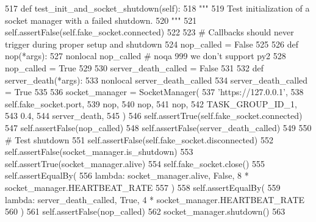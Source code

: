 \begin{DoxyCode}
517     \textcolor{keyword}{def }test\_init\_and\_socket\_shutdown(self):
518         \textcolor{stringliteral}{"""}
519 \textcolor{stringliteral}{        Test initialization of a socket manager with a failed shutdown.}
520 \textcolor{stringliteral}{        """}
521         self.assertFalse(self.fake\_socket.connected)
522 
523         \textcolor{comment}{# Callbacks should never trigger during proper setup and shutdown}
524         nop\_called = \textcolor{keyword}{False}
525 
526         \textcolor{keyword}{def }nop(*args):
527             nonlocal nop\_called  \textcolor{comment}{# noqa 999 we don't support py2}
528             nop\_called = \textcolor{keyword}{True}
529 
530         server\_death\_called = \textcolor{keyword}{False}
531 
532         \textcolor{keyword}{def }server\_death(*args):
533             nonlocal server\_death\_called
534             server\_death\_called = \textcolor{keyword}{True}
535 
536         socket\_manager = SocketManager(
537             \textcolor{stringliteral}{'https://127.0.0.1'},
538             self.fake\_socket.port,
539             nop,
540             nop,
541             nop,
542             TASK\_GROUP\_ID\_1,
543             0.4,
544             server\_death,
545         )
546         self.assertTrue(self.fake\_socket.connected)
547         self.assertFalse(nop\_called)
548         self.assertFalse(server\_death\_called)
549 
550         \textcolor{comment}{# Test shutdown}
551         self.assertFalse(self.fake\_socket.disconnected)
552         self.assertFalse(socket\_manager.is\_shutdown)
553         self.assertTrue(socket\_manager.alive)
554         self.fake\_socket.close()
555         self.assertEqualBy(
556             \textcolor{keyword}{lambda}: socket\_manager.alive, \textcolor{keyword}{False}, 8 * socket\_manager.HEARTBEAT\_RATE
557         )
558         self.assertEqualBy(
559             \textcolor{keyword}{lambda}: server\_death\_called, \textcolor{keyword}{True}, 4 * socket\_manager.HEARTBEAT\_RATE
560         )
561         self.assertFalse(nop\_called)
562         socket\_manager.shutdown()
563 
\end{DoxyCode}
\mbox{\label{classparlai_1_1mturk_1_1core_1_1legacy__2018_1_1test_1_1test__socket__manager_1_1TestSocketManagerSetupAndFunctions_a293bf275e608bb099686bad59db2cbf0}} 
